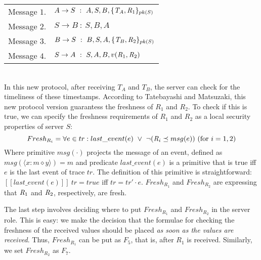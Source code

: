 \documentclass{entcs} \usepackage{entcsmacro}
\newcommand{\IO}{\ensuremath{\diamond}}
\begin{document}
\begin{tabular}{c l}
Message $1$.&$A \rightarrow S \ : \ A,S,B, \{\emph{T}_A, \emph{R}_1\}_{pk(S)} $ \\
Message $2$.&$S \rightarrow B \ : \ S,B,A $ \\
Message $3$.&$B \rightarrow S \ : \ B,S,A, \{\emph{T}_B, \emph{R}_2\}_{pk(S)} $ \\
Message $4$.&$S \rightarrow A \ : \ S,A,B, v(\emph{R}_1,\emph{R}_2) $ \\
\end{tabular}\\

In this new protocol, after receiving $T_A$ and $T_B$, the server can
check for the timeliness of these timestamps.  According to
Tatebayashi and Matsuzaki, this new protocol version guarantess the
freshness of $R_1$ and $R_2$. To check if this is true, we can specify
the freshness requirements of $R_1$ and $R_2$ as a local security
properties of server $S$:
$$Fresh_{R_i} = \forall e \in tr: last\_event(e) \ \vee \ 
\neg(\emph{R}_i \preceq msg(e) ) \text{ (for }i=1,2)$$
Where primitive $msg(\cdot)$ projects the message of an event, defined
as $msg(\langle x: m \IO y\rangle)=m$ and predicate $last\_event(e)$
is a primitive that is true iff $e$ is the last event of trace $tr$.
The definition of this primitive is straightforward: $[\![
last\_event(e) ]\!] \ tr = true$ iff $tr=tr'\cdot e$.
$Fresh_{R_1}$ and $Fresh_{R_2}$ are expressing that 
 $\emph{R}_1$ and $\emph{R}_2$, respectively, are fresh.

The last step involves deciding where to put $Fresh_{R_1}$ and
$Fresh_{R_2}$ in the server role. This is easy: we make the decision that the formulae for checking the freshness of the received values should be placed \emph{as soon as the values are received}. Thus, $Fresh_{R_1}$ can be
put as $F_5$, that is, after $R_1$ is received. Similarly, we set $Fresh_{R_2}$ as $F_7$.
\end{document}
